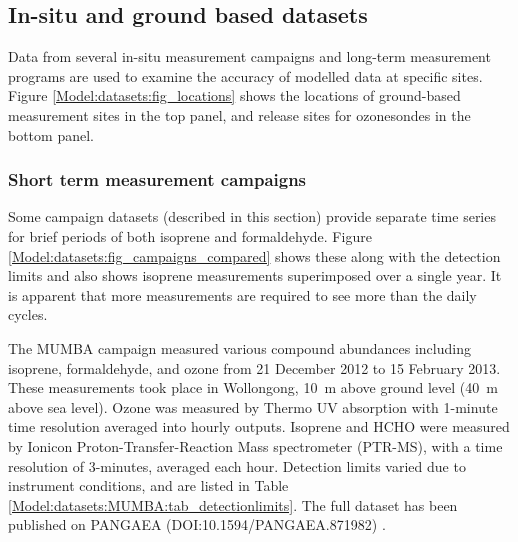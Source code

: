   \subsection{In-situ and ground based datasets}
  
    Data from several in-situ measurement campaigns and long-term measurement programs are used to examine the accuracy of modelled data at specific sites.
    Figure \ref{Model:datasets:fig_locations} shows the locations of ground-based measurement sites in the top panel, and release sites for ozonesondes in the bottom panel.
    
    
    \subsubsection{Short term measurement campaigns}
      Some campaign datasets (described in this section) provide separate time series for brief periods of both isoprene and formaldehyde.
      Figure \ref{Model:datasets:fig_campaigns_compared} shows these along with the detection limits and also shows isoprene measurements superimposed over a single year.
      It is apparent that more measurements are required to see more than the daily cycles.
      
    
    \label{Model:datasets:MUMBA}
    
      The MUMBA campaign \parencite{PatonWalsh2017} measured various compound abundances including isoprene, formaldehyde, and ozone from 21 December 2012 to 15 February 2013.
      These measurements took place in Wollongong, 10~m above ground level (40~m above sea level).
      Ozone was measured by Thermo UV absorption with 1-minute time resolution averaged into hourly outputs.
      Isoprene and HCHO were measured by Ionicon Proton-Transfer-Reaction Mass spectrometer (PTR-MS), with a time resolution of 3-minutes, averaged each hour.
      Detection limits varied due to instrument conditions, and are listed in Table \ref{Model:datasets:MUMBA:tab_detectionlimits}.
      The full dataset has been published on PANGAEA (DOI:10.1594/PANGAEA.871982) \parencite{Guerette2018}.
      
